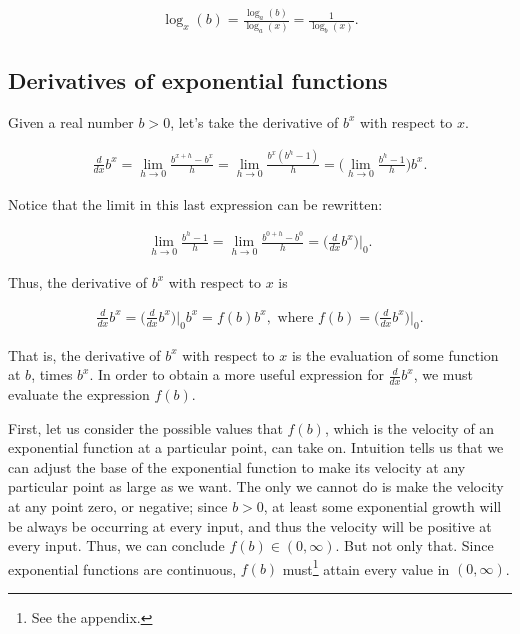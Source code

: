 \begin{align*}
    \log_x(b) = \frac{\log_a(b)}{\log_a(x)} = \frac{1}{\log_b(x)}.
\end{align*}

\subsection*{Derivatives of exponential functions}

Given a real number $b > 0$, let's take the derivative of $b^x$ with respect to $x$.

\begin{align*}
    \frac{d}{dx} b^x = \lim_{h \rightarrow 0} \frac{b^{x + h} - b^x}{h}
    = \lim_{h \rightarrow 0} \frac{b^x (b^h - 1)}{h}
    = \Big( \lim_{h \rightarrow 0} \frac{b^h - 1}{h} \Big) b^x.
\end{align*}

Notice that the limit in this last expression can be rewritten:

\begin{align*}
    \lim_{h \rightarrow 0} \frac{b^h - 1}{h} = \lim_{h \rightarrow 0} \frac{b^{0 + h} - b^0}{h} = \Big( \frac{d}{dx} b^x \Big)\Big|_0.
\end{align*}

Thus, the derivative of $b^x$ with respect to $x$ is

\begin{align*}
   \frac{d}{dx} b^x = \Big( \frac{d}{dx} b^x \Big)\Big|_0 b^x = f(b) b^x, \text{ where $f(b) = \Big( \frac{d}{dx} b^x \Big)\Big|_0$}.
\end{align*}

That is, the derivative of $b^x$ with respect to $x$ is the evaluation of some function at $b$, times $b^x$. In order to obtain a more useful expression for $\frac{d}{dx} b^x$, we must evaluate the expression $f(b)$. 

First, let us consider the possible values that $f(b)$, which is the velocity of an exponential function at a particular point, can take on. Intuition tells us that we can adjust the base of the exponential function to make its velocity at any particular point as large as we want. The only we cannot do is make the velocity at any point zero, or negative; since $b > 0$, at least some exponential growth will be always be occurring at every input, and thus the velocity will be positive at every input. Thus, we can conclude $f(b) \in (0, \infty)$. But not only that. Since exponential functions are continuous, $f(b)$ must\footnote{See the appendix.} attain every value in $(0, \infty)$.

